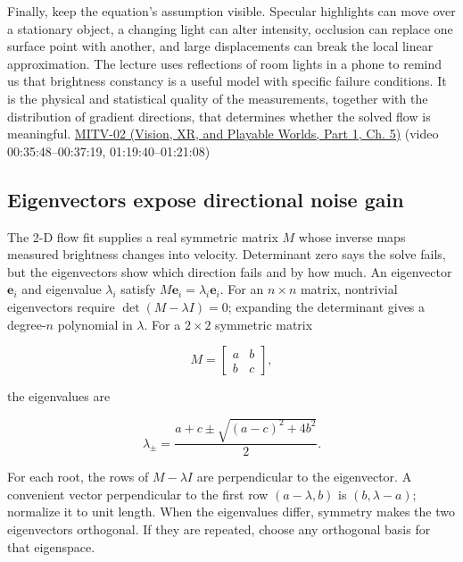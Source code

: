 Finally, keep the equation's assumption visible. Specular highlights can move over a stationary object, a changing light can alter intensity, occlusion can replace one surface point with another, and large displacements can break the local linear approximation. The lecture uses reflections of room lights in a phone to remind us that brightness constancy is a useful model with specific failure conditions. It is the physical and statistical quality of the measurements, together with the distribution of gradient directions, that determines whether the solved flow is meaningful. \href{../07-Vision-XR-and-Playable-Worlds-P01/main.pdf\#nameddest=04-visual-computing-ii-ch036-mitv-02---image-formation-perspective-projection-time-derivative-motion-field}{MITV-02 (Vision, XR, and Playable Worlds, Part 1, Ch. 5)} (video 00:35:48--00:37:19, 01:19:40--01:21:08)

\subsection{Eigenvectors expose directional noise gain}\label{04-visual-computing-ii-ch030-eigenvectors-expose-directional-noise-gain}

\hypertarget{04-visual-computing-ii-ch030-eigenvectors-expose-directional-noise-gain}{}

The 2-D flow fit supplies a real symmetric matrix \(M\) whose inverse maps measured brightness changes into velocity. Determinant zero says the solve fails, but the eigenvectors show which direction fails and by how much. An eigenvector \(\mathbf e_i\) and eigenvalue \(\lambda_i\) satisfy \(M\mathbf e_i=\lambda_i\mathbf e_i\). For an \(n\times n\) matrix, nontrivial eigenvectors require \(\det(M-\lambda I)=0\); expanding the determinant gives a degree-\(n\) polynomial in \(\lambda\). For a \(2\times2\) symmetric matrix

\[
M=\begin{bmatrix}a&b\\b&c\end{bmatrix},
\]

the eigenvalues are

\[
\lambda_{\pm}=\frac{a+c\pm\sqrt{(a-c)^2+4b^2}}{2}.
\]

For each root, the rows of \(M-\lambda I\) are perpendicular to the eigenvector. A convenient vector perpendicular to the first row \((a-\lambda,b)\) is \((b,\lambda-a)\); normalize it to unit length. When the eigenvalues differ, symmetry makes the two eigenvectors orthogonal. If they are repeated, choose any orthogonal basis for that eigenspace.


